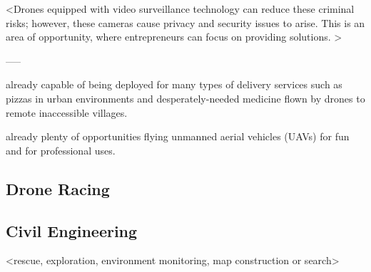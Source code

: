 <Drones equipped with video surveillance technology can reduce these criminal risks; however, these cameras cause privacy and security issues to arise. This is an area of opportunity, where entrepreneurs can focus on providing solutions. >

-----


already capable of being deployed for many types of delivery services 
such as pizzas in urban environments and 
desperately-needed medicine flown by drones to remote inaccessible villages.


already plenty of opportunities 
flying unmanned aerial vehicles (UAVs) for fun 
and for professional uses. %





\subsection{Drone Racing}



\subsection{Civil Engineering}



<rescue,   exploration,  environment  monitoring,  map  construction  or  search>






















